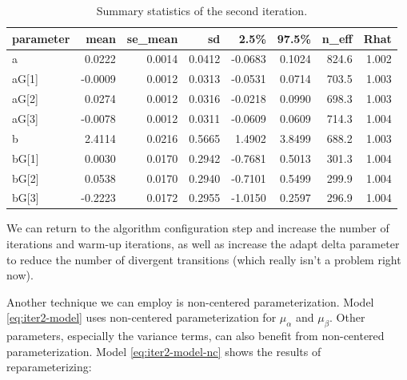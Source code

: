 \documentclass[11pt, oneside, openany]{scrbook}
\begin{document}
\begin{table}[!h]

\caption{\label{tab:ch042-Liquid-Strawberry-Eagle}Summary statistics of the second iteration.}
\centering
\begin{tabular}[t]{lrrrrrrr}
\toprule
parameter & mean & se\_mean & sd & 2.5\% & 97.5\% & n\_eff & Rhat\\
\midrule
a & 0.0222 & 0.0014 & 0.0412 & -0.0683 & 0.1024 & 824.6 & 1.002\\
aG[1] & -0.0009 & 0.0012 & 0.0313 & -0.0531 & 0.0714 & 703.5 & 1.003\\
aG[2] & 0.0274 & 0.0012 & 0.0316 & -0.0218 & 0.0990 & 698.3 & 1.003\\
aG[3] & -0.0078 & 0.0012 & 0.0311 & -0.0609 & 0.0609 & 714.3 & 1.004\\
b & 2.4114 & 0.0216 & 0.5665 & 1.4902 & 3.8499 & 688.2 & 1.003\\
\addlinespace
bG[1] & 0.0030 & 0.0170 & 0.2942 & -0.7681 & 0.5013 & 301.3 & 1.004\\
bG[2] & 0.0538 & 0.0170 & 0.2940 & -0.7101 & 0.5499 & 299.9 & 1.004\\
bG[3] & -0.2223 & 0.0172 & 0.2955 & -1.0150 & 0.2597 & 296.9 & 1.004\\
\bottomrule
\end{tabular}
\end{table}

We can return to the algorithm configuration step and increase the number of iterations and warm-up iterations, as well as increase the adapt delta parameter to reduce the number of divergent transitions (which really isn't a problem right now).

Another technique we can employ is non-centered parameterization. Model \eqref{eq:iter2-model} uses non-centered parameterization for \(\mu_\alpha\) and \(\mu_\beta\). Other parameters, especially the variance terms, can also benefit from non-centered parameterization. Model \eqref{eq:iter2-model-nc} shows the results of reparameterizing:

\end{document}

